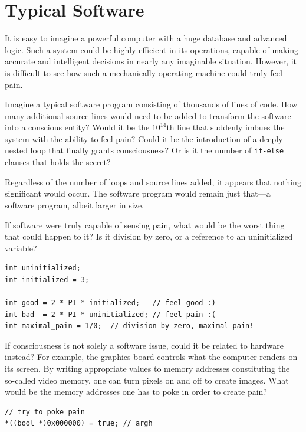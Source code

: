 \chapter{Typical Software}
\label{chap:typical-software}

It is easy to imagine a powerful computer with a huge database and advanced logic. 
Such a system could be highly efficient in its operations, capable of making accurate and intelligent decisions in nearly any imaginable situation. 
However, it is difficult to see how such a mechanically operating machine could truly feel pain.

Imagine a typical software program consisting of thousands of lines of code. How many additional source lines would need to be added to 
transform the software into a conscious entity? Would it be the $10^{14}$th line that suddenly imbues the system with the ability to feel pain? 
Could it be the introduction of a deeply nested loop that finally grants consciousness? Or is it the number of \texttt{if-else} clauses that holds the secret?

Regardless of the number of loops and source lines added, it appears that nothing significant would occur. 
The software program would remain just that---a software program, albeit larger in size.

If software were truly capable of sensing pain, what would be the worst thing that could happen to it? 
Is it division by zero, or a reference to an uninitialized variable?

\begin{verbatim}
int uninitialized;
int initialized = 3;

int good = 2 * PI * initialized;   // feel good :)
int bad  = 2 * PI * uninitialized; // feel pain :(
int maximal_pain = 1/0;  // division by zero, maximal pain!
\end{verbatim}

If consciousness is not solely a software issue, could it be related to hardware instead? For example, the graphics board controls what the 
computer renders on its screen. By writing appropriate values to memory addresses constituting the so-called video memory, one can turn pixels 
on and off to create images. What would be the memory addresses one has to poke in order to create pain?

\begin{verbatim}
// try to poke pain
*((bool *)0x000000) = true; // argh
\end{verbatim}


